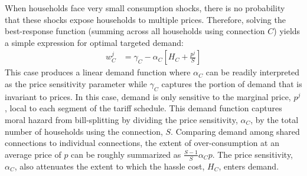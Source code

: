\documentclass[12pt]{article}
\begin{document}
When households face very small consumption shocks, there is no probability that these shocks expose households to multiple prices.  Therefore, solving the best-response function (summing across all households using connection $C$) yields a simple expression for optimal targeted demand:
\begin{align}
\label{equation:demandlinear}
w^{j}_C &= \gamma_C - \alpha_C [H_{C} + \frac{p^{j}}{S}]  
\end{align}
This case produces a linear demand function where $\alpha_C$ can be readily interpreted as the price sensitivity parameter while $\gamma_C$ captures the portion of demand that is invariant to prices.  In this case, demand is only sensitive to the marginal price, $p^{j}$, local to each segment of the tariff schedule.  This demand function captures moral hazard from bill-splitting by dividing the price sensitivity, $\alpha_C$, by the total number of households using the connection, $S$.  Comparing demand among shared connections to individual connections, the extent of over-consumption at an average price of $p$ can be roughly summarized as $\frac{S-1}{S} \alpha_C p $.  The price sensitivity, $\alpha_C$, also attenuates the extent to which the hassle cost, $H_C$, enters demand.  
\end{document}
